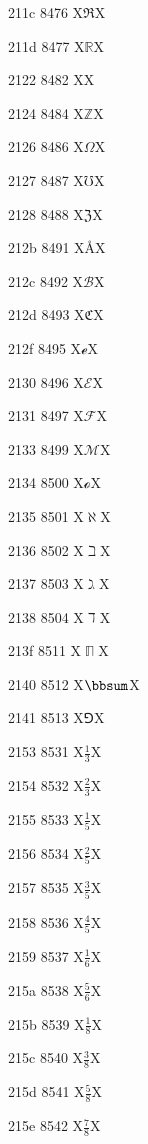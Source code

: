 \documentclass[11pt]{article}
\begin{document}
211c 8476 X{\ensuremath{\Re}}X

211d 8477 X{\ensuremath{\mathbb{R}}}X

2122 8482 X{\texttrademark}X

2124 8484 X{\ensuremath{\mathbb{Z}}}X

2126 8486 X{\ensuremath{\Omega}}X

2127 8487 X{\ensuremath{\mho}}X

2128 8488 X{\ensuremath{\mathfrak{Z}}}X

212b 8491 X{\AA}X

212c 8492 X{\ensuremath{\mathscr{B}}}X

212d 8493 X{\ensuremath{\mathfrak{C}}}X

212f 8495 X{\ensuremath{\mathscr{e}}}X

2130 8496 X{\ensuremath{\mathscr{E}}}X

2131 8497 X{\ensuremath{\mathscr{F}}}X

2133 8499 X{\ensuremath{\mathscr{M}}}X

2134 8500 X{\ensuremath{\mathscr{o}}}X

2135 8501 X{\ensuremath{\aleph}}X

2136 8502 X{\ensuremath{\beth}}X

2137 8503 X{\ensuremath{\gimel}}X

2138 8504 X{\ensuremath{\daleth}}X

213f 8511 X{\ensuremath{\BbbPi}}X

2140 8512 X{\ensuremath{\bbsum}}X

2141 8513 X{\ensuremath{\Game}}X

2153 8531 X{\ensuremath{\frac{1}{3}}}X

2154 8532 X{\ensuremath{\frac{2}{3}}}X

2155 8533 X{\ensuremath{\frac{1}{5}}}X

2156 8534 X{\ensuremath{\frac{2}{5}}}X

2157 8535 X{\ensuremath{\frac{3}{5}}}X

2158 8536 X{\ensuremath{\frac{4}{5}}}X

2159 8537 X{\ensuremath{\frac{1}{6}}}X

215a 8538 X{\ensuremath{\frac{5}{6}}}X

215b 8539 X{\ensuremath{\frac{1}{8}}}X

215c 8540 X{\ensuremath{\frac{3}{8}}}X

215d 8541 X{\ensuremath{\frac{5}{8}}}X

215e 8542 X{\ensuremath{\frac{7}{8}}}X
\end{document}
